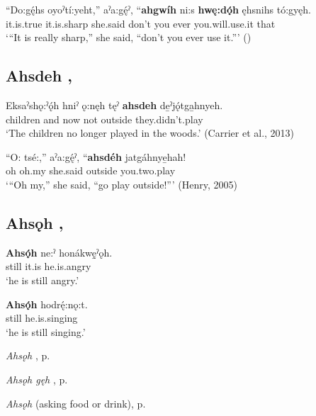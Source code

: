 \ea
\label{ex:apart3}
\gll “Do:gę́hs oyoˀtí:yeht,” aˀa:gę́ˀ, “\textbf{ahgwíh} ni:s \textbf{hwę:dǫ́h} ęhsnihs tó:gyęh.\\
it.is.true it.is.sharp she.said don’t you ever you.will.use.it that\\
\glt ‘“It is really sharp,” she said, “don’t you ever use it.”’ (\cite{henry_de_2005})
\z


\subsection*{\textbf{Ahsdeh} , } \label{p:[ahsdeh]}

\ea
\label{ex:apart9}
\gll Eksaˀshǫ:ˀǫ́h hniˀ ǫ:nęh tęˀ \textbf{ahsdeh} de̱ˀjǫ́tga̱hnyeh.\\
children and now not outside they.didn’t.play\\
\glt ‘The children no longer played in the woods.’ (Carrier et al., 2013)
\z

\ea
\label{ex:apart10}
\gll “O: tsé:,” aˀa:gę́ˀ, “\textbf{ahsdéh} jatgáhnye̱hah!\\
oh oh.my she.said outside you.two.play\\
\glt ‘“Oh my,” she said, “go play outside!”’ (Henry, 2005)
\z


\subsection*{\textbf{Ahsǫh} , } \label{p:[ahsǫh] ‘still’, ‘yet’}

\ea
\label{ex:apart5}
\gll \textbf{Ahsǫ́h} ne:ˀ honákwę̱ˀǫh.\\
still it.is he.is.angry\\
\glt ‘he is still angry.’
\z

\ea
\label{ex:apart6}
\gll \textbf{Ahsǫ́h} hodrę́:nǫ:t.\\
still he.is.singing\\
\glt ‘he is still singing.’
\z

\begin{CayugaRelated}
\item \textit{Ahsǫh} , p. \pageref{p:[ahsǫh] ‘more’}\\
\item \textit{Ahsǫh gęh} , p. \pageref{p:[ahsǫh gęh]}\\
\item \textit{Ahsǫh}  (asking food or drink), p. \pageref{p:[ahsǫh] ‘more’ (asking food or drink)}
\end{CayugaRelated}

